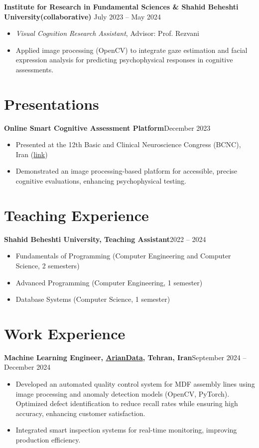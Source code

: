 \documentclass[a4paper,10pt]{article}
\begin{document}
\textbf{Institute for Research in Fundamental Sciences & Shahid Beheshti University(collaborative) }\hfill July 2023 -- May 2024
\vspace{-0.5em}
\begin{itemize}
  \item \textit{Visual Cognition Research Assistant}, Advisor: Prof. Rezvani
  \item Applied image processing (OpenCV) to integrate gaze estimation and facial expression analysis for predicting psychophysical responses in cognitive assessments.
\end{itemize}

\section*{Presentations}
\textbf{Online Smart Cognitive Assessment Platform}\hfill December 2023
\vspace{-0.5em}
\begin{itemize}
  \item Presented at the 12th Basic and Clinical Neuroscience Congress (BCNC), Iran (\href{https://lnkd.in/d6aYv6Wt}{link})
  \item Demonstrated an image processing-based platform for accessible, precise cognitive evaluations, enhancing psychophysical testing.
\end{itemize}

\section*{Teaching Experience}
\textbf{Shahid Beheshti University, Teaching Assistant}\hfill 2022 -- 2024
\vspace{-0.5em}
\begin{itemize}
  \item Fundamentals of Programming (Computer Engineering and Computer Science, 2 semesters)
  \item Advanced Programming (Computer Engineering, 1 semester)
  \item Database Systems (Computer Science, 1 semester)
\end{itemize}

\section*{Work Experience}
\textbf{Machine Learning Engineer, \href{https://www.linkedin.com/company/ariandata}{ArianData}, Tehran, Iran}\hfill September 2024 -- December 2024
\vspace{-0.5em}
\begin{itemize}
  \item Developed an automated quality control system for MDF assembly lines using image processing and anomaly detection models (OpenCV, PyTorch). Optimized defect identification to reduce recall rates while ensuring high accuracy, enhancing customer satisfaction.
  \item Integrated smart inspection systems for real-time monitoring, improving production efficiency.
\end{itemize}
\end{document}
